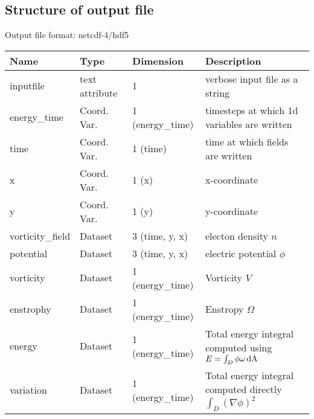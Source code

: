 \subsection{Structure of output file}
Output file format: netcdf-4/hdf5
%
\begin{longtable}{lll>{\RaggedRight}p{7cm}}
\toprule
\rowcolor{gray!50}\textbf{Name} &  \textbf{Type} & \textbf{Dimension} & \textbf{Description}  \\ \midrule
inputfile  &             text attribute & 1 & verbose input file as a string \\
energy\_time             & Coord. Var. & 1 (energy\_time) & timesteps at which 1d variables are written \\
time                     & Coord. Var. & 1 (time) & time at which fields are written \\
x                        & Coord. Var. & 1 (x) & x-coordinate  \\
y                        & Coord. Var. & 1 (y) & y-coordinate \\
vorticity\_field         & Dataset & 3 (time, y, x) & electon density $n$ \\
potential                & Dataset & 3 (time, y, x) & electric potential $\phi$  \\
vorticity                & Dataset & 1 (energy\_time) & Vorticity $V$  \\
enstrophy                & Dataset & 1 (energy\_time) & Enstropy $\Omega$  \\
energy                   & Dataset & 1 (energy\_time) & Total energy integral computed using $E = \int_D \phi\omega \,\mathrm{dA}$ \\
variation                & Dataset & 1 (energy\_time) & Total energy integral computed directly $\int_D (\nabla \phi)^2$  \\
\bottomrule
\end{longtable}






